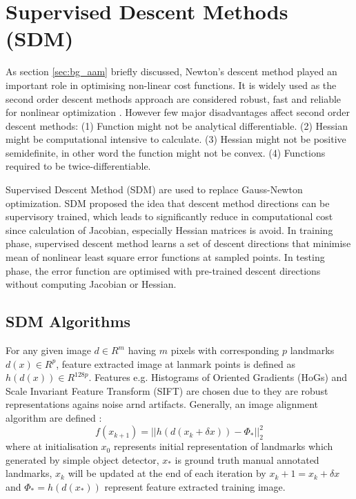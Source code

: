 \section{Supervised Descent Methods (SDM)}
\label{sec:SSD}
As section \ref{sec:bg_aam} briefly discussed, Newton's descent method played an important role in optimising non-linear cost functions. It is widely used as the second order descent methods approach are considered robust, fast and reliable for nonlinear optimization \cite{Xiong2013}. However few major disadvantages affect second order descent methods: (1) Function might not be analytical differentiable. (2) Hessian might be computational intensive to calculate. (3) Hessian might not be positive semidefinite, in other word the function might not be convex. (4) Functions required to be twice-differentiable.

Supervised Descent Method (SDM) are used to replace Gauss-Newton optimization. SDM proposed the idea that descent method directions can be supervisory trained, which leads to significantly reduce in computational cost since calculation of Jacobian, especially Hessian matrices is avoid. In training phase, supervised descent method learns a set of descent directions that minimise mean of nonlinear least square error functions at sampled points. In testing phase, the error function are optimised with pre-trained descent directions without computing Jacobian or Hessian.


\subsection{SDM Algorithms}
\label{sec:SDMs}
For any given image $d \in R^{m}$ having $m$ pixels with corresponding $p$ landmarks $d(x) \in R^{p}$, feature extracted image at lanmark points is defined as $h(d(x)) \in R^{128p}$. Features e.g. Histograms of Oriented Gradients (HoGs) and Scale Invariant Feature Transform (SIFT) \cite{Dalal2005,SIFT} are chosen due to they are robust representations agains noise arnd artifacts. Generally, an image alignment algorithm are defined \cite{Xiong2013}:
\begin{equation}
\label{eq:ssdnd}
f(x_{k+1})=||h(d(x_k+\delta x))-\Phi_*||^2_2
\end{equation}
where at initialisation $x_0$ represents initial representation of landmarks which generated by simple object detector, $x_*$ is ground truth manual annotated landmarks, $x_k$ will be updated at the end of each iteration by $x_k+1=x_k + \delta x$ and $\Phi_* = h(d(x_*))$ represent feature extracted training image. 

